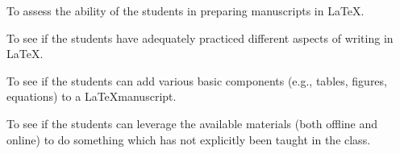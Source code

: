 \documentclass[12pt, a4paper]{article} %
\begin{document}
	
	\begin{itemize}
		{ \Large \item To assess the ability of the students in preparing manuscripts in \LaTeX.}
		{  \item To see if the students have adequately practiced different aspects of
			writing in \LaTeX.}
		{\item To see if the students can add various basic components (e.g., tables, figures, equations) to a \LaTeX manuscript.}	
		\newpage		
		{\small \item To see if the students can leverage the available materials (both offline and online) to do
		something which has not explicitly been taught in the class.}		
	\end{itemize}	
\end{document}
